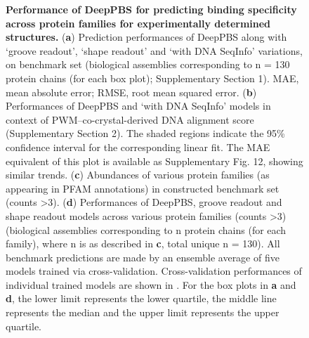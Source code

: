 \begin{center}
    \begin{figure}
        \caption[Performance of DeepPBS for predicting binding specificity across
protein families for experimentally determined structures.]{\textbf{Performance of DeepPBS for predicting binding specificity across
protein families for experimentally determined structures.} ({\bf a}) Prediction performances of DeepPBS along with ‘groove readout’, ‘shape readout’ and ‘with DNA SeqInfo’ variations, on benchmark set (biological assemblies corresponding to n = 130 protein chains (for each box plot); Supplementary Section 1). MAE, mean absolute error; RMSE, root mean squared error. ({\bf b}) Performances of DeepPBS and ‘with DNA SeqInfo’ models in context of PWM–co-crystal-derived DNA alignment score (Supplementary Section 2). The shaded regions indicate
the 95\% confidence interval for the corresponding linear fit. The MAE equivalent of this plot is available as Supplementary Fig. 12, showing similar trends. ({\bf c}) Abundances of various protein families (as appearing in PFAM annotations) in constructed benchmark set (counts >3). ({\bf d}) Performances of DeepPBS, groove readout and shape readout models across various protein families (counts >3) (biological assemblies corresponding to n protein chains (for each family), where n is as described in {\bf c}, total unique n = 130). All benchmark predictions are made by an ensemble average of five models trained via cross-validation. Cross-validation performances of individual trained models are shown in . For the box plots in {\bf a} and {\bf d}, the lower limit represents the lower quartile, the middle line represents the median and the upper limit represents the upper quartile.}
  \label{fig:pdna2}
\end{figure}
\end{center}

